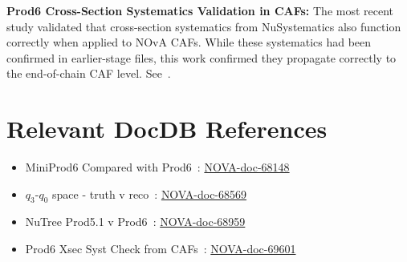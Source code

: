 \documentclass{article}
\begin{document}
\medskip

\textbf{Prod6 Cross-Section Systematics Validation in CAFs:} The most recent study validated that cross-section systematics from NuSystematics also function correctly when applied to NOvA CAFs. While these systematics had been confirmed in earlier-stage files, this work confirmed they propagate correctly to the end-of-chain CAF level. See~\cite{gnissen-xsecsyst}.

\section{Relevant DocDB References}

\begin{itemize}
    \item MiniProd6 Compared with Prod6~\cite{gnissen-miniprod6-prod6}: \href{https://nova-docdb.fnal.gov/cgi-bin/sso/ShowDocument?docid=68148}{NOVA-doc-68148}
    \item $q_3$-$q_0$ space - truth v reco~\cite{gnissen-q3q0}: \href{https://nova-docdb.fnal.gov/cgi-bin/sso/ShowDocument?docid=68569}{NOVA-doc-68569}
    \item NuTree Prod5.1 v Prod6~\cite{gnissen-nutree}: \href{https://nova-docdb.fnal.gov/cgi-bin/sso/ShowDocument?docid=68959}{NOVA-doc-68959}
    \item Prod6 Xsec Syst Check from CAFs~\cite{gnissen-xsecsyst}: \href{https://nova-docdb.fnal.gov/cgi-bin/sso/ShowDocument?docid=69601}{NOVA-doc-69601}
\end{itemize}



\end{document}
